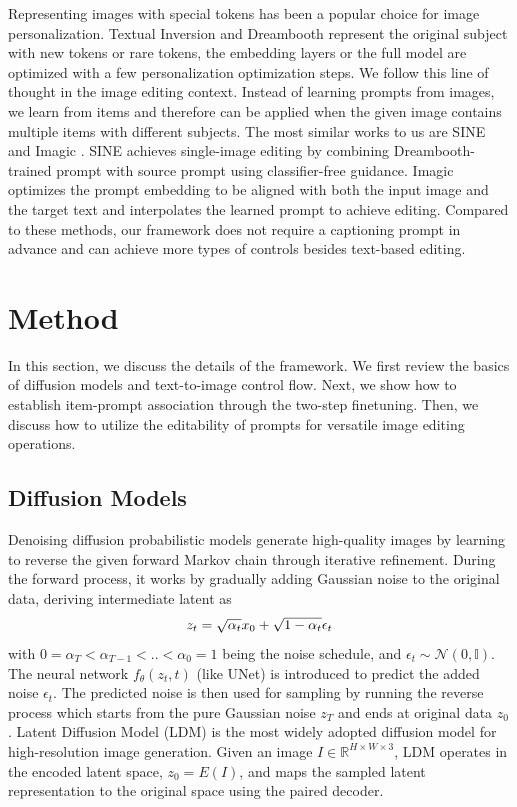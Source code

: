 Representing images with special tokens has been a popular choice for image personalization.
Textual Inversion \cite{gal2022image} and Dreambooth \cite{ruiz2023dreambooth} represent the original subject with new tokens or rare tokens, the embedding layers or the full model are optimized with a few personalization optimization steps.
We follow this line of thought in the image editing context. Instead of learning prompts from images, we learn from items and therefore can be applied when the given image contains multiple items with different subjects.
The most similar works to us are SINE \cite{zhang2023sine} and Imagic \cite{kawar2023imagic}.
SINE achieves single-image editing by combining Dreambooth-trained prompt with source prompt using classifier-free guidance.
Imagic optimizes the prompt embedding to be aligned with both the input image and the target text and interpolates the learned prompt to achieve editing.
Compared to these methods, our framework does not require a captioning prompt in advance and can achieve more types of controls besides text-based editing. 



   
\section{Method}
In this section, we discuss the details of the \dedit{} framework.
We first review the basics of diffusion models and text-to-image control flow.
Next, we show how to establish item-prompt association through the two-step finetuning.
Then, we discuss how to utilize the editability of prompts for versatile image editing operations.

\subsection{Diffusion Models}
 Denoising diffusion probabilistic models generate high-quality images by learning to reverse the given forward Markov chain through iterative refinement.
During the forward process, it works by gradually adding Gaussian noise to the original data, deriving intermediate latent as
\begin{equation}
\vspace{-1.2 pt}
\begin{split}
z_t = \sqrt{\alpha_t}x_0 + \sqrt{1-\alpha_t} \epsilon_t
\end{split}
\end{equation}
with $0=\alpha_T<\alpha_{T-1}<..<\alpha_0=1$ being the noise schedule, and $\epsilon_t \sim \mathcal{N}(0,\mathbb{I})$.
The neural network $f_\theta(z_t, t)$ (like UNet) is introduced to predict the added noise $\epsilon_t$.
The predicted noise is then used for sampling by running the reverse process which starts from the pure Gaussian noise $z_T$ and ends at original data $z_0$.
Latent Diffusion Model (LDM) is the most widely adopted diffusion model for high-resolution image generation. 
Given an image $I\in\mathbb{R}^{H\times W \times 3}$, LDM operates in the encoded latent space, $z_0 = E(I)$, and maps the sampled latent representation to the original space using the paired decoder.


